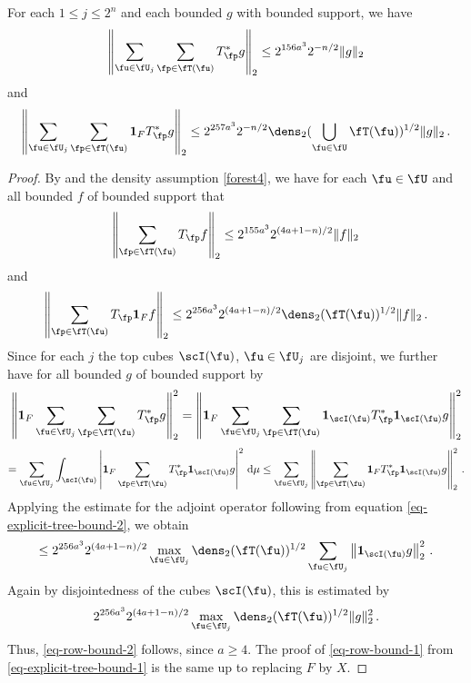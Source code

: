 \begin{lemma}
    \label{row-bound}
    \leanok
    For each $1 \le j \le 2^n$ and each bounded $g$ with bounded support, we have
    \begin{equation}
        \label{eq-row-bound-1}
        \left\| \sum_{\fu \in \fU_j} \sum_{\fp \in \fT(\fu)} T_{\fp}^* g\right\|_2 \le 2^{156a^3} 2^{-n/2} \|g\|_2
    \end{equation}
    and
    \begin{equation}
        \label{eq-row-bound-2}
        \left\| \sum_{\fu \in \fU_j} \sum_{\fp \in \fT(\fu)} \mathbf{1}_F T_{\fp}^* g\right\|_2 \le 2^{257a^3} 2^{-n/2} \dens_2(\bigcup_{\fu\in \fU}\fT(\fu))^{1/2} \|g\|_2\,.
    \end{equation}
\end{lemma}

\begin{proof}
    By  and the density assumption \eqref{forest4}, we have for each $\fu \in \fU$ and all bounded $f$ of bounded support that
    \begin{equation}
        \label{eq-explicit-tree-bound-1}
        \left\|\sum_{\fp \in \fT(\fu)} T_{\fp} f \right\|_{2} \le 2^{155a^3} 2^{(4a+1-n)/2} \|f\|_2\,
    \end{equation}
    and
    \begin{equation}
        \label{eq-explicit-tree-bound-2}
        \left\|\sum_{\fp \in \fT(\fu)} T_{\fp} \mathbf{1}_F f \right\|_{2} \le 2^{256a^3} 2^{(4a + 1-n)/2} \dens_2(\fT(\fu))^{1/2} \|f\|_2\,.
    \end{equation}
    Since for each $j$ the top cubes $\scI(\fu)$, $\fu \in \fU_j$ are disjoint, we further have for all bounded $g$ of bounded support by 
    $$
        \left\|\mathbf{1}_F \sum_{\fu \in \fU_j} \sum_{\fp \in \fT(\fu)} T_{\fp}^* g\right\|_2^2 = \left\|\mathbf{1}_F \sum_{\fu \in \fU_j} \sum_{\fp \in \fT(\fu)} \mathbf{1}_{\scI(\fu)} T_{\fp}^* \mathbf{1}_{\scI(\fu)} g\right\|_2^2
    $$
    $$
        = \sum_{\fu \in \fU_j} \int_{\scI(\fu)} \left| \mathbf{1}_F \sum_{\fp \in \fT(\fu)} T_{\fp}^* \mathbf{1}_{\scI(\fu)} g\right|^2 \, \mathrm{d}\mu
        \le \sum_{\fu \in \fU_j} \left\|\sum_{\fp \in \fT(\fu)} \mathbf{1}_F T_{\fp}^* \mathbf{1}_{\scI(\fu)} g\right\|_2^2\,.
    $$
    Applying the estimate for the adjoint operator following from equation \eqref{eq-explicit-tree-bound-2}, we obtain
    $$
        \le 2^{256a^3} 2^{(4a+1-n)/2} \max_{\fu \in \fU_j}\dens_2(\fT(\fu))^{1/2} \sum_{\fu \in \fU_j} \left\| \mathbf{1}_{\scI(\fu)} g\right\|_2^2\,.
    $$
    Again by disjointedness of the cubes $\scI(\fu)$, this is estimated by
    $$
        2^{256a^3} 2^{(4a+1-n)/2} \max_{\fu \in \fU_j}\dens_2(\fT(\fu))^{1/2} \|g\|_2^2\,.
    $$
    Thus, \eqref{eq-row-bound-2} follows, since $a \ge 4$.
    The proof of \eqref{eq-row-bound-1} from \eqref{eq-explicit-tree-bound-1} is the same up to replacing $F$ by $X$.
\end{proof}


